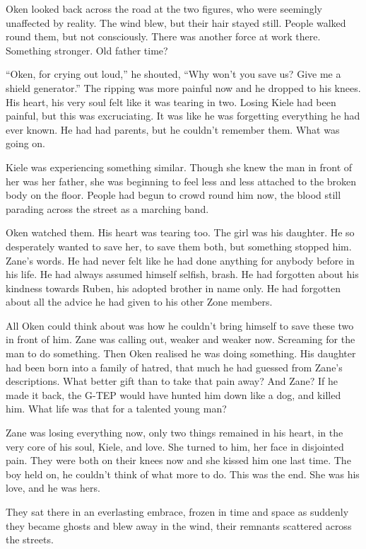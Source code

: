Oken looked back across the road at the two figures, who were seemingly unaffected by reality.  The wind blew, but their hair stayed still.  People walked round them, but not consciously.  There was another force at work there.  Something stronger.  Old father time?

``Oken, for crying out loud,'' he shouted, ``Why won't you save us?  Give me a shield generator.''  The ripping was more painful now and he dropped to his knees.  His heart, his very soul felt like it was tearing in two.  Losing Kiele had been painful, but this was excruciating.  It was like he was forgetting everything he had ever known.  He had had parents, but he couldn't remember them.  What was going on.

Kiele was experiencing something similar.  Though she knew the man in front of her was her father, she was beginning to feel less and less attached to the broken body on the floor.  People had begun to crowd round him now, the blood still parading across the street as a marching band.

Oken watched them.  His heart was tearing too.  The girl was his daughter.  He so desperately wanted to save her, to save them both, but something stopped him.  Zane's words.  He had never felt like he had done anything for anybody before in his life.  He had always assumed himself selfish, brash.  He had forgotten about his kindness towards Ruben, his adopted brother in name only.  He had forgotten about all the advice he had given to his other Zone members.

All Oken could think about was how he couldn't bring himself to save these two in front of him.  Zane was calling out, weaker and weaker now.  Screaming for the man to do something.  Then Oken realised he was doing something.  His daughter had been born into a family of hatred, that much he had guessed from Zane's descriptions.  What better gift than to take that pain away?  And Zane?  If he made it back, the G-TEP would have hunted him down like a dog, and killed him.  What life was that for a talented young man?

Zane was losing everything now, only two things remained in his heart, in the very core of his soul, Kiele, and love.  She turned to him, her face in disjointed pain.  They were both on their knees now and she kissed him one last time.  The boy held on, he couldn't think of what more to do.  This was the end.  She was his love, and he was hers.

They sat there in an everlasting embrace, frozen in time and space as suddenly they became ghosts and blew away in the wind, their remnants scattered across the streets.  

